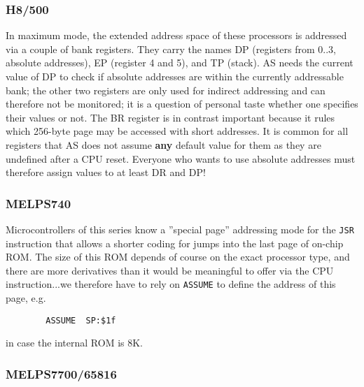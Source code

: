\documentclass[12pt,twoside]{report}
\newcommand{\bb}[1]{{\bf #1}}
\newcommand{\tty}[1]{{\tt #1}}
\begin{document}
\subsubsection{H8/500}

In maximum mode, the extended address space of these processors is
addressed via a couple of bank registers.  They carry the names DP
(registers from 0..3, absolute addresses), EP (register 4 and 5), and TP
(stack).  AS needs the current value of DP to check if absolute addresses
are within the currently addressable bank; the other two registers are
only used for indirect addressing and can therefore not be monitored; it
is a question of personal taste whether one specifies their values or not.
The BR register is in contrast important because it rules which 256-byte
page may be accessed with short addresses.  It is common for all registers
that AS does not assume \bb{any} default value for them as they are
undefined after a CPU reset.  Everyone who wants to use absolute addresses
must therefore assign values to at least DR and DP!


\subsubsection{MELPS740}

Microcontrollers of this series know a ''special page'' addressing mode
for the \tty{JSR} instruction that allows a shorter coding for jumps into
the last page of on-chip ROM.  The size of this ROM depends of course
on the exact processor type, and there are more derivatives than it
would be meaningful to offer via the CPU instruction...we therefore
have to rely on \tty{ASSUME} to define the address of this page, e.g.
\begin{verbatim}
        ASSUME  SP:$1f
\end{verbatim}
in case the internal ROM is 8K.


\subsubsection{MELPS7700/65816}
\end{document}
